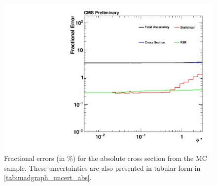 \begin{figure}[!p]
    \centering
    \includegraphics[width=\textwidth]{figures/madgraph_uncertainty_absolute.pdf}
    \caption[
        Fractional errors (in \%) for the absolute cross section from the
        \MADGRAPH MC sample.
    ]{
        Fractional errors (in \%) for the absolute cross section from the
        \MADGRAPH MC sample. These uncertainties are also presented in tabular
        form in \cref{tab:madgraph_uncert_abs}.
    }
    \label{fig:madgraph_uncert_abs}
\end{figure}
